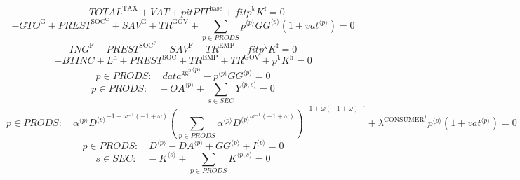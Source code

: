 \begin{equation}
-{T\!O\!T\!A\!L}^{\mathrm{TAX}} + {V\!A\!T} + {{p\!i\!t}} {{P\!I\!T}^{\mathrm{base}}} + {{f\!i\!t}} {p^{\mathrm{k}}} {K^{\mathrm{f}}} = 0
\end{equation}
\begin{equation}
-{G\!T\!O}^{\mathrm{G}} + {P\!R\!E\!S\!T}^{\mathrm{SOC}^{\mathrm{G}}} + {S\!A\!V}^{\mathrm{G}} + {T\!R}^{\mathrm{GOV}} + \sum_{p\in {P\!R\!O\!D\!S}} {{p}^{\langle p\rangle}} {{{G\!G}}^{\langle p\rangle}} \left(1 + {{v\!a\!t}}^{\langle p\rangle}\right) = 0
\end{equation}
\begin{equation}
{I\!N\!G}^{\mathrm{F}} - {P\!R\!E\!S\!T}^{\mathrm{SOC}^{\mathrm{F}}} - {S\!A\!V}^{\mathrm{F}} - {T\!R}^{\mathrm{EMP}} - {{f\!i\!t}} {p^{\mathrm{k}}} {K^{\mathrm{f}}} = 0
\end{equation}
\begin{equation}
-{B\!T\!I\!N\!C} + L^{\mathrm{h}} + {P\!R\!E\!S\!T}^{\mathrm{SOC}} + {T\!R}^{\mathrm{EMP}} + {T\!R}^{\mathrm{GOV}} + {p^{\mathrm{k}}} {K^{\mathrm{h}}} = 0
\end{equation}
\begin{equation}
p\in {P\!R\!O\!D\!S}\colon\quad {{d\!a\!t\!a}^{\mathrm{gg}^{\mathrm{p}}}}^{\langle p\rangle} - {{p}^{\langle p\rangle}} {{{G\!G}}^{\langle p\rangle}} = 0
\end{equation}
\begin{equation}
p\in {P\!R\!O\!D\!S}\colon\quad -{{O\!A}}^{\langle p\rangle} + \sum_{s\in {S\!E\!C}} {Y}^{\langle p,s\rangle} = 0
\end{equation}
\begin{equation}
p\in {P\!R\!O\!D\!S}\colon\quad {{\alpha}^{\langle p\rangle}} {{{D}^{\langle p\rangle}}^{-1 + {\omega}^{-1} \left(-1 + \omega\right)}} {\left(\sum_{p\in {P\!R\!O\!D\!S}} {{\alpha}^{\langle p\rangle}} {{{D}^{\langle p\rangle}}^{{\omega}^{-1} \left(-1 + \omega\right)}}\right)^{-1 + {\omega} \left(-1 + \omega\right)^{-1}}} + {\lambda^{\mathrm{CONSUMER}^{\mathrm{1}}}} {{p}^{\langle p\rangle}} \left(1 + {{v\!a\!t}}^{\langle p\rangle}\right) = 0
\end{equation}
\begin{equation}
p\in {P\!R\!O\!D\!S}\colon\quad {D}^{\langle p\rangle} - {{D\!A}}^{\langle p\rangle} + {{G\!G}}^{\langle p\rangle} + {I}^{\langle p\rangle} = 0
\end{equation}
\begin{equation}
s\in {S\!E\!C}\colon\quad -{K}^{\langle s\rangle} + \sum_{p\in {P\!R\!O\!D\!S}} {K}^{\langle p,s\rangle} = 0
\end{equation}
